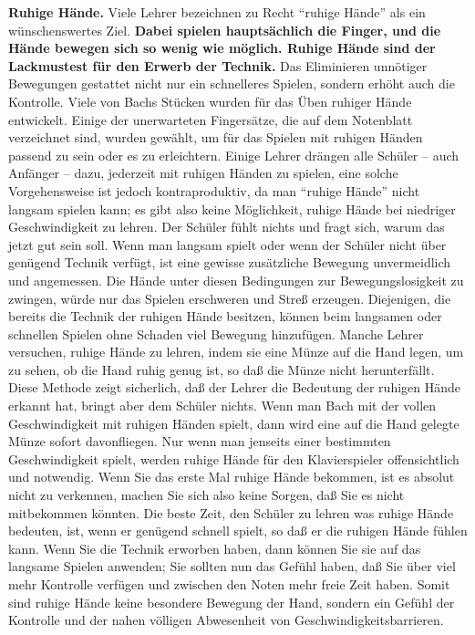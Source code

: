 \textbf{Ruhige Hände.}
Viele Lehrer bezeichnen zu Recht \enquote{ruhige Hände} als ein wünschenswertes Ziel.
\textbf{Dabei spielen hauptsächlich die Finger, und die Hände bewegen sich so wenig wie möglich.
Ruhige Hände sind der Lackmustest für den Erwerb der Technik.}
Das Eliminieren unnötiger Bewegungen gestattet nicht nur ein schnelleres Spielen, sondern erhöht auch die Kontrolle.
Viele von Bachs Stücken wurden für das Üben ruhiger Hände entwickelt.
Einige der unerwarteten Fingersätze, die auf dem Notenblatt verzeichnet sind, wurden gewählt, um für das Spielen mit ruhigen Händen passend zu sein oder es zu erleichtern.
Einige Lehrer drängen alle Schüler -- auch Anfänger -- dazu, jederzeit mit ruhigen Händen zu spielen, eine solche Vorgehensweise ist jedoch kontraproduktiv, da man \enquote{ruhige Hände} nicht langsam spielen kann; es gibt also keine Möglichkeit, ruhige Hände bei niedriger Geschwindigkeit zu lehren.
Der Schüler fühlt nichts und fragt sich, warum das jetzt gut sein soll.
Wenn man langsam spielt oder wenn der Schüler nicht über genügend Technik verfügt, ist eine gewisse zusätzliche Bewegung unvermeidlich und angemessen.
Die Hände unter diesen Bedingungen zur Bewegungslosigkeit zu zwingen, würde nur das Spielen erschweren und Streß erzeugen.
Diejenigen, die bereits die Technik der ruhigen Hände besitzen, können beim langsamen oder schnellen Spielen ohne Schaden viel Bewegung hinzufügen.
Manche Lehrer versuchen, ruhige Hände zu lehren, indem sie eine Münze auf die Hand legen, um zu sehen, ob die Hand ruhig genug ist, so daß die Münze nicht herunterfällt.
Diese Methode zeigt sicherlich, daß der Lehrer die Bedeutung der ruhigen Hände erkannt hat, bringt aber dem Schüler nichts.
Wenn man Bach mit der vollen Geschwindigkeit mit ruhigen Händen spielt, dann wird eine auf die Hand gelegte Münze sofort davonfliegen.
Nur wenn man jenseits einer bestimmten Geschwindigkeit spielt, werden ruhige Hände für den Klavierspieler offensichtlich und notwendig.
Wenn Sie das erste Mal ruhige Hände bekommen, ist es absolut nicht zu verkennen, machen Sie sich also keine Sorgen, daß Sie es nicht mitbekommen könnten.
Die beste Zeit, den Schüler zu lehren was ruhige Hände bedeuten, ist, wenn er genügend schnell spielt, so daß er die ruhigen Hände fühlen kann.
Wenn Sie die Technik erworben haben, dann können Sie sie auf das langsame Spielen anwenden; Sie sollten nun das Gefühl haben, daß Sie über viel mehr Kontrolle verfügen und zwischen den Noten mehr freie Zeit haben.
Somit sind ruhige Hände keine besondere Bewegung der Hand, sondern ein Gefühl der Kontrolle und der nahen völligen Abwesenheit von Geschwindigkeitsbarrieren.

